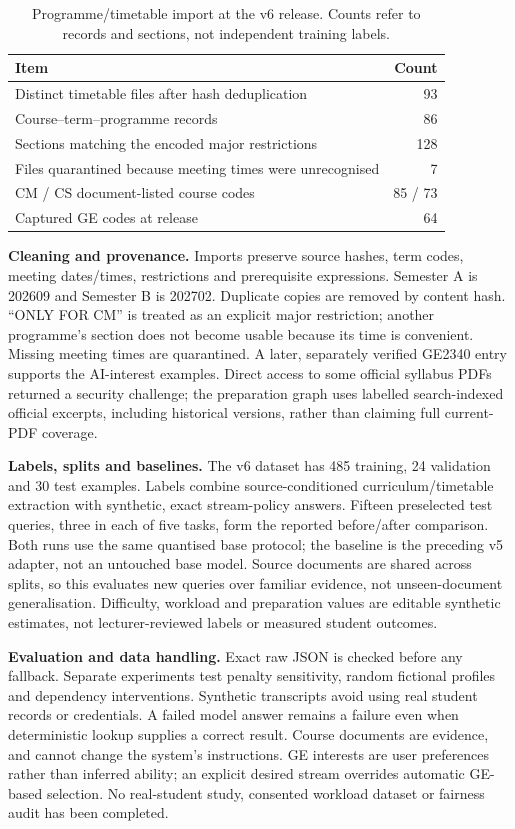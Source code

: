 \documentclass{article}
\begin{document}
\begin{table}[H]
\centering\small
\caption{Programme/timetable import at the v6 release. Counts refer to records and sections, not independent training labels.}
\begin{tabular}{p{3.85in}r}
\toprule
Item & Count\\
\midrule
Distinct timetable files after hash deduplication & 93\\
Course--term--programme records & 86\\
Sections matching the encoded major restrictions & 128\\
Files quarantined because meeting times were unrecognised & 7\\
CM / CS document-listed course codes & 85 / 73\\
Captured GE codes at release & 64\\
\bottomrule
\end{tabular}
\label{tab:data}
\end{table}

\textbf{Cleaning and provenance.} Imports preserve source hashes, term codes, meeting dates/times, restrictions and prerequisite expressions. Semester A is 202609 and Semester B is 202702. Duplicate copies are removed by content hash. ``ONLY FOR CM'' is treated as an explicit major restriction; another programme's section does not become usable because its time is convenient. Missing meeting times are quarantined. A later, separately verified GE2340 entry supports the AI-interest examples. Direct access to some official syllabus PDFs returned a security challenge; the preparation graph uses labelled search-indexed official excerpts, including historical versions, rather than claiming full current-PDF coverage.

\newpage
\textbf{Labels, splits and baselines.} The v6 dataset has 485 training, 24 validation and 30 test examples. Labels combine source-conditioned curriculum/timetable extraction with synthetic, exact stream-policy answers. Fifteen preselected test queries, three in each of five tasks, form the reported before/after comparison. Both runs use the same quantised base protocol; the baseline is the preceding v5 adapter, not an untouched base model. Source documents are shared across splits, so this evaluates new queries over familiar evidence, not unseen-document generalisation. Difficulty, workload and preparation values are editable synthetic estimates, not lecturer-reviewed labels or measured student outcomes.

\textbf{Evaluation and data handling.} Exact raw JSON is checked before any fallback. Separate experiments test penalty sensitivity, random fictional profiles and dependency interventions. Synthetic transcripts avoid using real student records or credentials. A failed model answer remains a failure even when deterministic lookup supplies a correct result. Course documents are evidence, and cannot change the system's instructions. GE interests are user preferences rather than inferred ability; an explicit desired stream overrides automatic GE-based selection. No real-student study, consented workload dataset or fairness audit has been completed.
\end{document}
